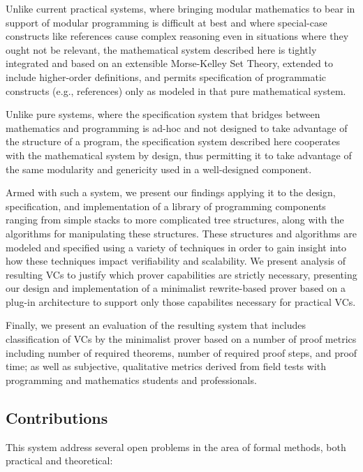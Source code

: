 Unlike current practical systems, where bringing modular mathematics to bear in support of modular programming is difficult at best and where special-case constructs like references cause complex reasoning even in situations where they ought not be relevant, the mathematical system described here is tightly integrated and based on an extensible Morse-Kelley Set Theory, extended to include higher-order definitions, and permits specification of programmatic constructs (e.g., references) only as modeled in that pure mathematical system.

Unlike pure systems, where the specification system that bridges between mathematics and programming is ad-hoc and not designed to take advantage of the structure of a program, the specification system described here cooperates with the mathematical system by design, thus permitting it to take advantage of the same modularity and genericity used in a well-designed component.

Armed with such a system, we present our findings applying it to the design, specification, and implementation of a library of programming components ranging from simple stacks to more complicated tree structures, along with the algorithms for manipulating these structures.  These structures and algorithms are modeled and specified using a variety of techniques in order to gain insight into how these techniques impact verifiability and scalability.  We present analysis of resulting VCs to justify which prover capabilities are strictly necessary, presenting our design and implementation of a minimalist rewrite-based prover based on a plug-in architecture to support only those capabilites necessary for practical VCs.

Finally, we present an evaluation of the resulting system that includes classification of VCs by the minimalist prover based on a number of proof metrics including number of required theorems, number of required proof steps, and proof time; as well as subjective, qualitative metrics derived from field tests with programming and mathematics students and professionals.

\subsection{Contributions\label{sec:contributions}}
This system address several open problems in the area of formal methods, both practical and theoretical:

